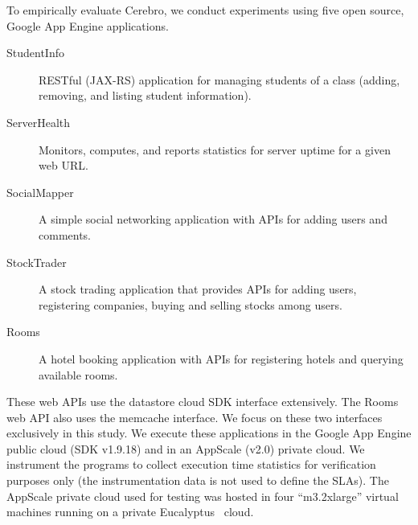 To empirically evaluate Cerebro, we conduct experiments using five open source, Google
App Engine applications.

\begin{description}
\item[StudentInfo] RESTful (JAX-RS) application for managing
students of a class (adding, removing, and listing student information).
\item[ServerHealth] Monitors, computes, and reports statistics for server
uptime for a given web URL.
\item[SocialMapper] A simple social networking application with APIs for
adding users and comments.
\item[StockTrader] A stock trading application that
provides APIs for adding users, registering companies, buying and selling
stocks among users. 
\item[Rooms] A hotel booking application with APIs
for registering hotels and querying available rooms.
\end{description}

These web APIs use the datastore
cloud SDK interface extensively. The Rooms web API also uses the
memcache interface. We focus on these two interfaces exclusively in this
study. We execute these applications in the Google App Engine public cloud 
(SDK v1.9.18)
and in an AppScale (v2.0) private cloud.  We instrument the programs to collect
execution time statistics for verification purposes only 
(the instrumentation data is not used to define
the SLAs).  The AppScale private cloud used for testing was
hosted in four ``m3.2xlarge'' virtual machines running on a private
Eucalyptus~\cite{eucalyptus09} cloud.




